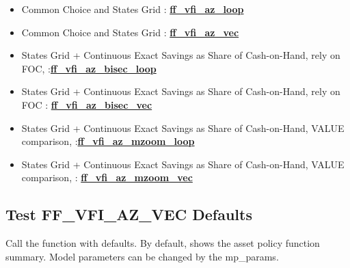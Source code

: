 \documentclass[
]{book}
\begin{document}
\begin{itemize}
\item
  Common Choice and States Grid :
  \href{https://github.com/FanWangEcon/MEconTools/blob/master/MEconTools/vfi/ff_vfi_az_loop.m}{\textbf{ff\_vfi\_az\_loop}}
\item
  Common Choice and States Grid :
  \href{https://github.com/FanWangEcon/MEconTools/blob/master/MEconTools/vfi/ff_vfi_az_vec.m}{\textbf{ff\_vfi\_az\_vec}}
\item
  States Grid + Continuous Exact Savings as Share of Cash-on-Hand,
  rely on FOC, :\href{https://github.com/FanWangEcon/MEconTools/blob/master/MEconTools/vfi/ff_vfi_az_bisec_loop.m}{\textbf{ff\_vfi\_az\_bisec\_loop}}
\item
  States Grid + Continuous Exact Savings as Share of Cash-on-Hand,
  rely on FOC :
  \href{https://github.com/FanWangEcon/MEconTools/blob/master/MEconTools/vfi/ff_vfi_az_bisec_vec.m}{\textbf{ff\_vfi\_az\_bisec\_vec}}
\item
  States Grid + Continuous Exact Savings as Share of Cash-on-Hand,
  VALUE comparison, :\href{https://github.com/FanWangEcon/MEconTools/blob/master/MEconTools/vfi/ff_vfi_az_mzoom_loop.m}{\textbf{ff\_vfi\_az\_mzoom\_loop}}
\item
  States Grid + Continuous Exact Savings as Share of Cash-on-Hand,
  VALUE comparison, :
  \href{https://github.com/FanWangEcon/MEconTools/blob/master/MEconTools/vfi/ff_vfi_az_mzoom_vec.m}{\textbf{ff\_vfi\_az\_mzoom\_vec}}
\end{itemize}

\hypertarget{test-ff_vfi_az_vec-defaults}{%
\subsection{Test FF\_VFI\_AZ\_VEC Defaults}\label{test-ff_vfi_az_vec-defaults}}

Call the function with defaults. By default, shows the asset policy
function summary. Model parameters can be changed by the mp\_params.
\end{document}
